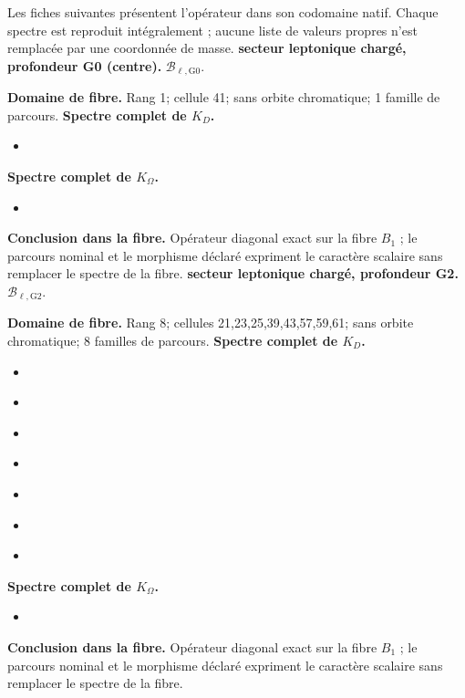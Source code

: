 \begingroup
\small
\setlength{\parskip}{.12\baselineskip}
\let\texttt\textnormal
Les fiches suivantes présentent l’opérateur dans son codomaine natif. Chaque spectre est reproduit intégralement ; aucune liste de valeurs propres n’est remplacée par une coordonnée de masse.
\noindent\textbf{secteur leptonique chargé, profondeur G0 (centre).} \(\mathcal B_{\ell,\mathrm{G0}}\).\par
\noindent\textbf{Domaine de fibre.} Rang 1; cellule 41; sans orbite chromatique; 1 famille de parcours.
\noindent\textbf{Spectre complet de \(K_D\).}
\begin{itemize}
\item \texttt{}
\end{itemize}
\noindent\textbf{Spectre complet de \(K_\Omega\).}
\begin{itemize}
\item \texttt{}
\end{itemize}
\noindent\textbf{Conclusion dans la fibre.} Opérateur diagonal exact sur la fibre \(B_1\) ; le parcours nominal et le morphisme déclaré expriment le caractère scalaire sans remplacer le spectre de la fibre.
\medskip
{}
\noindent\textbf{secteur leptonique chargé, profondeur G2.} \(\mathcal B_{\ell,\mathrm{G2}}\).\par
\noindent\textbf{Domaine de fibre.} Rang 8; cellules 21,23,25,39,43,57,59,61; sans orbite chromatique; 8 familles de parcours.
\noindent\textbf{Spectre complet de \(K_D\).}
\begin{itemize}
\item \texttt{}
\item \texttt{}
\item \texttt{}
\item \texttt{}
\item \texttt{}
\item \texttt{}
\item \texttt{}
\end{itemize}
\noindent\textbf{Spectre complet de \(K_\Omega\).}
\begin{itemize}
\item \texttt{}
\end{itemize}
\noindent\textbf{Conclusion dans la fibre.} Opérateur diagonal exact sur la fibre \(B_1\) ; le parcours nominal et le morphisme déclaré expriment le caractère scalaire sans remplacer le spectre de la fibre.
